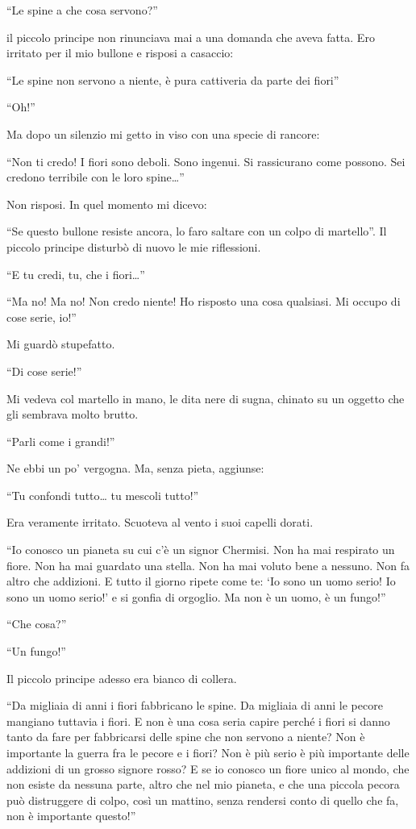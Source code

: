 \documentclass[11pt]{scrbook}
\begin{document}
``Le spine a che cosa servono?''

il piccolo principe non rinunciava mai a una domanda che aveva fatta. Ero irritato per il mio bullone e risposi a casaccio:

``Le spine non servono a niente, è pura cattiveria da parte dei fiori''

``Oh!''

Ma dopo un silenzio mi getto in viso con una specie di rancore:

``Non ti credo! I fiori sono deboli. Sono ingenui. Si rassicurano come possono. Sei credono terribile con le loro spine\ldots{}''

Non risposi. In quel momento mi dicevo:

``Se questo bullone resiste ancora, lo faro saltare con un colpo di martello''. Il piccolo principe disturbò di nuovo le mie riflessioni.

``E tu credi, tu, che i fiori\ldots{}''

``Ma no! Ma no! Non credo niente! Ho risposto una cosa qualsiasi. Mi occupo di cose serie, io!''

Mi guardò stupefatto.

``Di cose serie!''

Mi vedeva col martello in mano, le dita nere di sugna, chinato su un oggetto che gli sembrava molto brutto.

``Parli come i grandi!''

Ne ebbi un po' vergogna. Ma, senza pieta, aggiunse:

``Tu confondi tutto\ldots{} tu mescoli tutto!''

Era veramente irritato. Scuoteva al vento i suoi capelli dorati.

``Io conosco un pianeta su cui c'è un signor Chermisi. Non ha mai respirato un fiore. Non ha mai guardato una stella. Non ha mai voluto bene a nessuno. Non fa altro che addizioni. E tutto il giorno ripete come te: `Io sono un uomo serio! Io sono un uomo serio!' e si gonfia di orgoglio. Ma non è un uomo, è un fungo!''

``Che cosa?''

``Un fungo!''

Il piccolo principe adesso era bianco di collera.

``Da migliaia di anni i fiori fabbricano le spine. Da migliaia di anni le pecore mangiano tuttavia i fiori. E non è una cosa seria capire perché i fiori si danno tanto da fare per fabbricarsi delle spine che non servono a niente? Non è importante la guerra fra le pecore e i fiori? Non è più serio è più importante delle addizioni di un grosso signore rosso? E se io conosco un fiore unico al mondo, che non esiste da nessuna parte, altro che nel mio pianeta, e che una piccola pecora può distruggere di colpo, così un mattino, senza rendersi conto di quello che fa, non è importante questo!''
\end{document}

